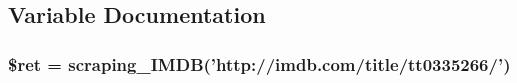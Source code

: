 \subsection{Variable Documentation}
\hypertarget{example__scraping__imdb_8php_affd9e3eb0aad0a7ca42912cd925f148c}{
\subsubsection[{\$ret}]{\setlength{\rightskip}{0pt plus 5cm}\$ret = {\bf scraping\+\_\+\+I\+M\+D\+B}('http\+://imdb.\+com/title/tt0335266/')}}\label{example__scraping__imdb_8php_affd9e3eb0aad0a7ca42912cd925f148c}
